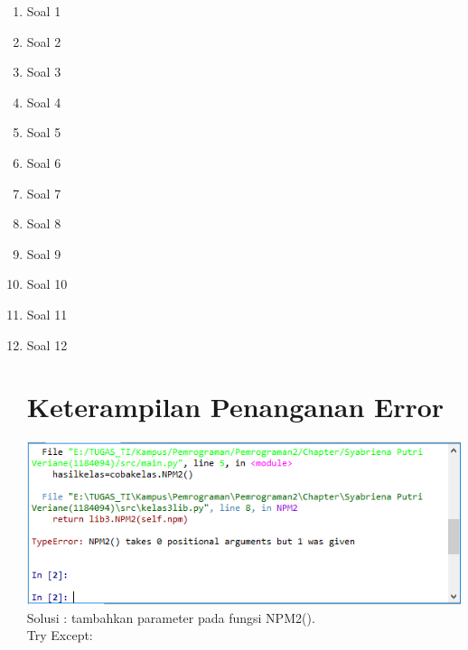 \begin{enumerate}
\item Soal 1


\item Soal 2


\item Soal 3


\item Soal 4


\item Soal 5


\item Soal 6


\item Soal 7


\item Soal 8


\item Soal 9


\item Soal 10


\item Soal 11


\item Soal 12


\section{Keterampilan Penanganan Error}
\includegraphics{gambar/error3.png}
Solusi : tambahkan parameter pada fungsi NPM2().\\

Try Except:


\end{enumerate}










